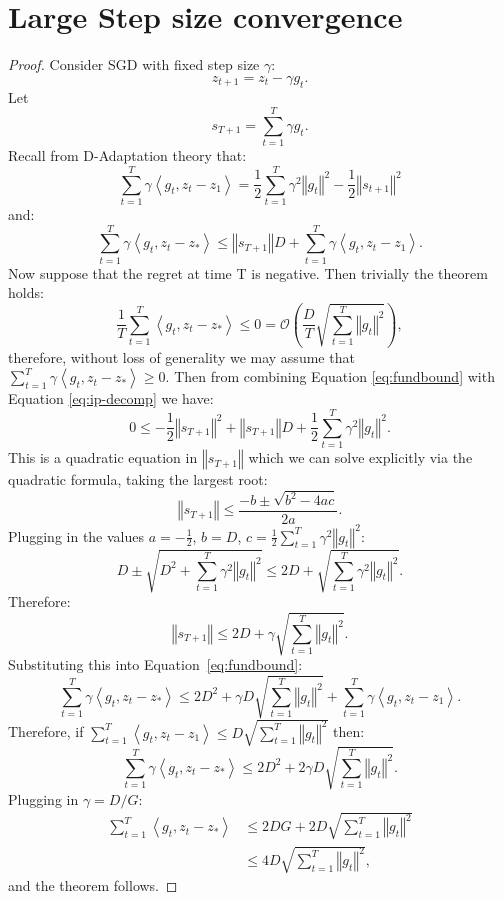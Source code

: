 \documentclass{article}
\begin{document}
\section{Large Step size convergence}
\largess
\begin{proof}
Consider SGD with fixed step size $\gamma$:
\[
z_{t+1}=z_{t}-\gamma g_{t}.
\]
Let 
\[
s_{T+1}=\sum_{t=1}^{T}\gamma g_{t}.
\]
Recall from D-Adaptation \citep{defazio2023dadapt} theory that:
\begin{equation}
\sum_{t=1}^{T}\gamma\left\langle g_{t},z_{t}-z_{1}\right\rangle =\frac{1}{2}\sum_{t=1}^{T}\gamma^{2}\left\Vert g_{t}\right\Vert ^{2}-\frac{1}{2}\left\Vert s_{t+1}\right\Vert ^{2}\label{eq:ip-decomp}
\end{equation}
and:
\begin{equation}
\sum_{t=1}^{T}\gamma\left\langle g_{t},z_{t}-z_{*}\right\rangle \leq\left\Vert s_{T+1}\right\Vert D+\sum_{t=1}^{T}\gamma\left\langle g_{t},z_{t}-z_{1}\right\rangle. \label{eq:fundbound}
\end{equation}
Now suppose that the regret at time T is negative. Then trivially
the theorem holds:
\[
\frac{1}{T}\sum_{t=1}^{T}\left\langle g_{t},z_{t}-z_*\right\rangle \leq0=\mathcal{O}\left(\frac{D}{T}\sqrt{\sum_{t=1}^{T}\left\Vert g_{t}\right\Vert ^{2}}\right),
\]
therefore, without loss of generality we may assume that $\sum_{t=1}^{T}\gamma\left\langle g_{t},z_{t}-z_*\right\rangle \geq0$.
Then from combining Equation \ref{eq:fundbound} with Equation \ref{eq:ip-decomp}
we have:
\[
0\leq-\frac{1}{2}\left\Vert s_{T+1}\right\Vert ^{2}+\left\Vert s_{T+1}\right\Vert D+\frac{1}{2}\sum_{t=1}^{T}\gamma^{2}\left\Vert g_{t}\right\Vert ^{2}.
\]
This is a quadratic equation in $\left\Vert s_{T+1}\right\Vert $
which we can solve explicitly via the quadratic formula, taking the
largest root:
\[
\left\Vert s_{T+1}\right\Vert \leq\frac{-b\pm\sqrt{b^{2}-4ac}}{2a}.
\]
Plugging in the values $a=-\frac{1}{2}$, $b=D$, $c=\frac{1}{2}\sum_{t=1}^{T}\gamma^{2}\left\Vert g_{t}\right\Vert ^{2}$:
\[
D\pm\sqrt{D^{2}+\sum_{t=1}^{T}\gamma^{2}\left\Vert g_{t}\right\Vert ^{2}}\leq2D+\sqrt{\sum_{t=1}^{T}\gamma^{2}\left\Vert g_{t}\right\Vert ^{2}}.
\]
Therefore:
\[
\left\Vert s_{T+1}\right\Vert \leq2D+\gamma\sqrt{\sum_{t=1}^{T}\left\Vert g_{t}\right\Vert ^{2}}.
\]
Substituting this into Equation~\ref{eq:fundbound}:
\[
\sum_{t=1}^{T}\gamma\left\langle g_{t},z_{t}-z_*\right\rangle \leq2D^{2}+\gamma D\sqrt{\sum_{t=1}^{T}\left\Vert g_{t}\right\Vert ^{2}}+\sum_{t=1}^{T}\gamma\left\langle g_{t},z_{t}-z_{1}\right\rangle .
\]
Therefore, if $\sum_{t=1}^{T}\left\langle g_{t},z_{t}-z_{1}\right\rangle \leq D\sqrt{\sum_{t=1}^{T}\left\Vert g_{t}\right\Vert ^{2}}$
then:
\[
\sum_{t=1}^{T}\gamma\left\langle g_{t},z_{t}-z_*\right\rangle \leq2D^{2}+2\gamma D\sqrt{\sum_{t=1}^{T}\left\Vert g_{t}\right\Vert ^{2}}.
\]
Plugging in $\gamma=D/G$:
\begin{align*}
\sum_{t=1}^{T}\left\langle g_{t},z_{t}-z_*\right\rangle  & \leq2DG+2D\sqrt{\sum_{t=1}^{T}\left\Vert g_{t}\right\Vert ^{2}} \\
 & \leq 4D\sqrt{\sum_{t=1}^{T}\left\Vert g_{t}\right\Vert ^{2}},
\end{align*}
and the theorem follows.
\end{proof}
\end{document}
